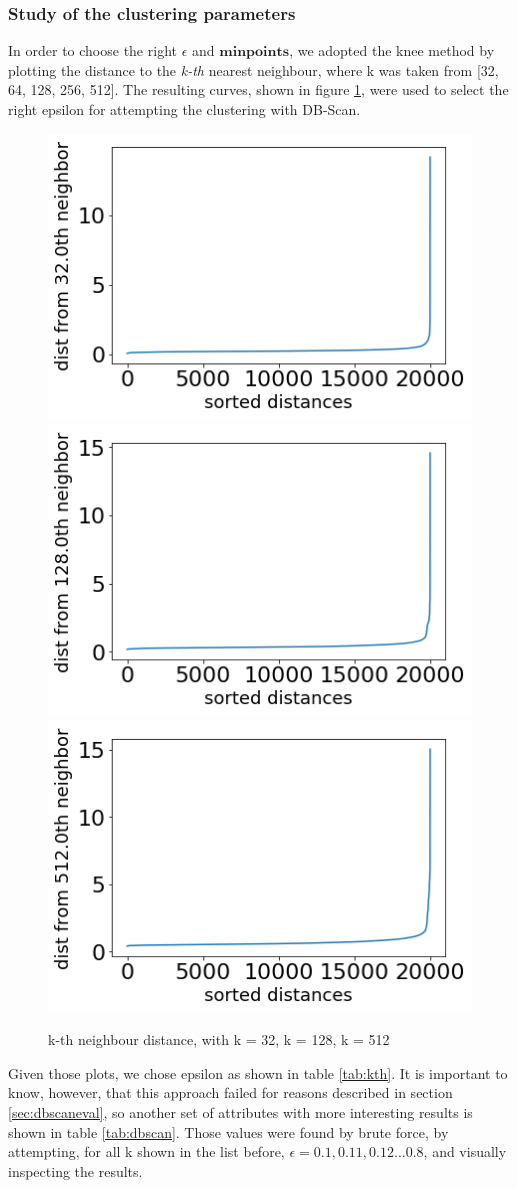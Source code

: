 \documentclass{article}
\begin{document}
\subsubsection{Study of the clustering parameters}
In order to choose the right $\epsilon$ and $\mathbf{min points}$, we adopted the knee method by plotting the distance to the \emph{k-th} nearest neighbour, where k was taken from [32, 64, 128, 256, 512]. The resulting curves, shown in figure \ref{fig:kth}, were used to select the right epsilon for attempting the clustering with DB-Scan. 
\begin{figure}[H]
\centering
\includegraphics[width=.32\textwidth]{a32}\hfill
\includegraphics[width=.32\textwidth]{a128}\hfill
\includegraphics[width=.32\textwidth]{a512}
\caption{k-th neighbour distance, with k = 32, k = 128, k = 512}
\label{fig:kth}
\end{figure}
Given those plots, we chose epsilon as shown in table \ref{tab:kth}.
It is important to know, however, that this approach failed for reasons described in section \ref{sec:dbscaneval}, so another set of attributes with more interesting results is shown in table \ref{tab:dbscan}. Those values were found by brute force, by attempting, for all k shown in the list before, $ \epsilon = 0.1, 0.11, 0.12\dots 0.8$, and visually inspecting the results.\\
\end{document}
